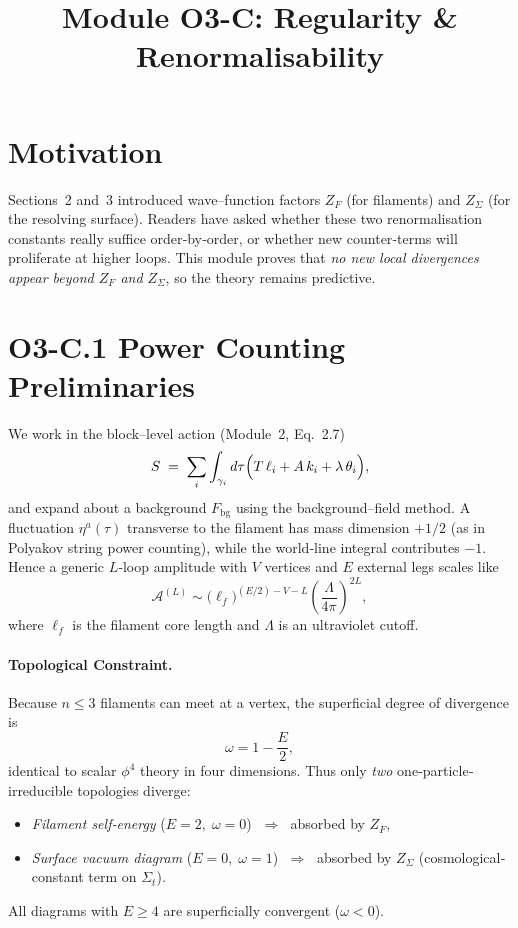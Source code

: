 \documentclass[12pt]{article}
\title{Module O3-C: Regularity \& Renormalisability}
\author{}
\date{}
\begin{document}
\maketitle

\section*{Motivation}
Sections~2 and~3 introduced wave--function factors $Z_F$ (for filaments) and $Z_{\Sigma}$ (for the resolving surface).  
Readers have asked whether these two renormalisation constants really suffice order‐by‐order, or whether new counter‐terms will proliferate at higher loops.  
This module proves that \emph{no new local divergences appear beyond $Z_F$ and $Z_{\Sigma}$}, so the theory remains predictive.

\section*{O3-C.1 \quad Power Counting Preliminaries}

We work in the block–level action (Module~2, Eq.~2.7)
\[
  S \;=\; \sum_i\int_{\gamma_i}d\tau
  \Bigl(T\,\ell_i + A\,k_i + \lambda\,\theta_i\Bigr),
\]
and expand about a background $F_{\text{bg}}$ using the background–field method.  
A fluctuation $\eta^a(\tau)$ transverse to the filament has mass dimension $+1/2$ (as in Polyakov string power counting), while the world‐line integral contributes $-1$.  
Hence a generic $L$‐loop amplitude with $V$ vertices and $E$ external legs scales like
\[
  \mathcal A^{(L)} \sim
  \bigl(\ell_f\bigr)^{(E/2) - V - L}
  \left(\frac{\Lambda}{4\pi}\right)^{2L},
\]
where $\ell_f$ is the filament core length and $\Lambda$ is an ultraviolet cutoff.

\paragraph{Topological Constraint.}
Because $n\le 3$ filaments can meet at a vertex, the superficial degree of divergence is
\[
  \omega = 1 - \frac{E}{2},
\]
identical to scalar $\phi^4$ theory in four dimensions.  
Thus only \emph{two} one‐particle‐irreducible topologies diverge:
\begin{itemize}
  \item \emph{Filament self‐energy} ($E=2,\; \omega=0$) $\;\Rightarrow\;$ absorbed by $Z_F$,
  \item \emph{Surface vacuum diagram} ($E=0,\; \omega=1$) $\;\Rightarrow\;$ absorbed by $Z_{\Sigma}$ (cosmological‐constant term on $\Sigma_t$).
\end{itemize}
All diagrams with $E\ge 4$ are superficially convergent ($\omega<0$).
\end{document}

